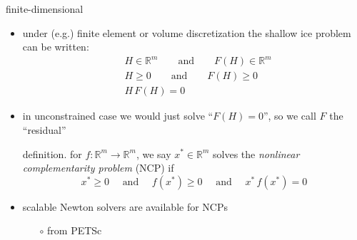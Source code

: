 \documentclass[hide notes,intlimits]{beamer}
\newcommand{\RR}{\mathbb{R}}
\begin{document}
\begin{frame}{finite-dimensional} 
\begin{itemize}
\item under (e.g.) finite element or volume discretization the shallow ice problem can be written:
\begin{align*}
&H\in \RR^m \qquad \text{and} \qquad F(H) \in \RR^m \\
&H \ge 0 \qquad \text{and} \qquad F(H) \ge 0 \\
&H \,F(H) = 0
\end{align*}
\item in unconstrained case we would just solve ``$F(H)=0$'', so we call $F$ the ``residual''

\vspace{2mm}
\begin{block}{definition.}
for $f:\RR^m \to \RR^m$, we say $x^* \in \RR^m$ solves the \emph{nonlinear complementarity problem} (NCP) if
  $$x^* \ge 0  \quad \text{ and } \quad f(x^*)\ge 0 \quad \text{ and } \quad x^*\,f(x^*)=0$$
\end{block}

\vspace{2mm}
\item scalable Newton solvers are available for NCPs
  \begin{itemize}
  \item[$\circ$] from PETSc
  \end{itemize}
\end{itemize}
\end{frame}
\end{document}
